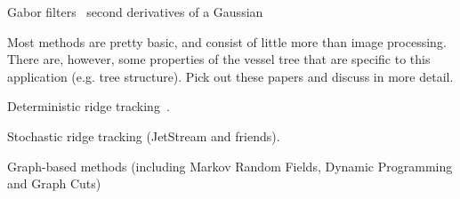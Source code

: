 Gabor filters~\cite{Soares_etal_TMI06}
second derivatives of a Gaussian~\cite{Staal_etal_TMI04}

Most methods are pretty basic, and consist of little more than image processing. There are, however, some properties of the vessel tree that are specific to this application (e.g. tree structure). Pick out these papers and discuss in more detail.

\nocite{Staal_etal_TMI04}
\nocite{Soared_etal_TMI06}
\nocite{}

Deterministic ridge tracking~\cite{Aylward_Bullitt_TMI02}.

Stochastic ridge tracking (JetStream and friends).

Graph-based methods (including Markov Random Fields, Dynamic Programming and Graph Cuts)